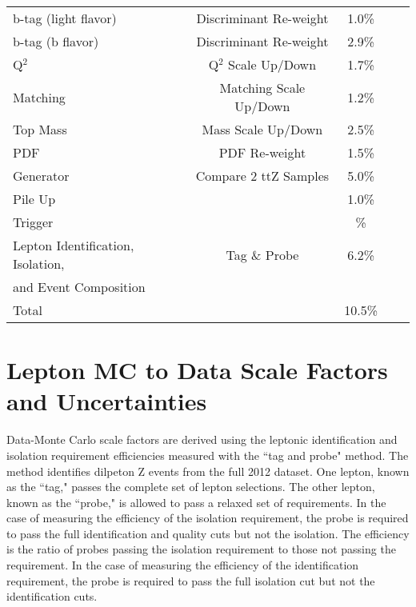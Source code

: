 \begin{table}[h]
\begin{center}
\begin{tabular}{lcccc}
b-tag (light flavor)                          & Discriminant Re-weight                              & 1.0\%       	\\
b-tag (b flavor)		                      & Discriminant Re-weight                              & 2.9\%	\\	
Q$^2$                                         & Q$^2$ Scale Up/Down                                 & 1.7\% \\
Matching                                      & Matching Scale Up/Down                              & 1.2\% \\
Top Mass                                      & Mass Scale Up/Down                                  & 2.5\% \\
PDF				                              & PDF Re-weight                                       & 1.5\%	\\
Generator                                     & Compare 2 ttZ Samples                               & 5.0\% \\
Pile Up                                       &                                                     & 1.0\% \\
Trigger                                       &                                                     & \lt 1\% \\
Lepton Identification, Isolation,             & Tag \& Probe                                        & 6.2\% \\
and Event Composition  & & \\
\hline
Total 					                                                                             & & 10.5\% 	\\
\hline
\end{tabular}
\end{center}
\end{table}

\section{Lepton MC to Data Scale Factors and Uncertainties}
\label{sec:tag_and_probe}

Data-Monte Carlo scale factors are derived using the leptonic identification and isolation requirement efficiencies measured with the ``tag and probe" method. The method identifies dilpeton Z events from the full 2012 dataset. One lepton, known as the ``tag," passes the complete set of lepton selections. The other lepton, known as the ``probe," is allowed to pass a relaxed set of requirements. In the case of measuring the efficiency of the isolation requirement, the probe is required to pass the full identification and quality cuts but not the isolation. The efficiency is the ratio of probes passing the isolation requirement to those not passing the requirement. In the case of measuring the efficiency of the identification requirement, the probe is required to pass the full isolation cut but not the identification cuts. \\

